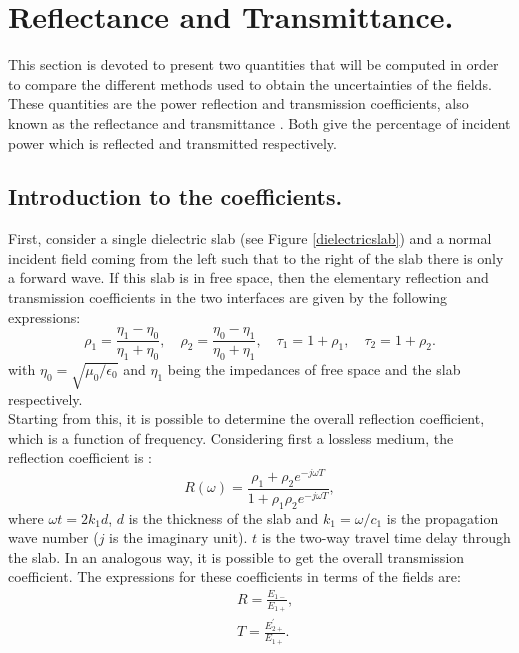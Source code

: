 \documentclass[12pt, oneside]{book}
\begin{document}
\chapter{Reflectance and Transmittance.}
This section is devoted to present two quantities that will be computed in order to compare the different methods used to obtain the uncertainties of the fields. These quantities are the power reflection and transmission coefficients, also known as the reflectance and transmittance \cite{orfanidis2002electromagnetic}. Both give the percentage of incident power which is reflected and transmitted respectively. 

\section{Introduction to the coefficients.}
\indent First, consider a single dielectric slab (see Figure \ref{dielectricslab}) and a normal incident field coming from the left such that to the right of the slab there is only a forward wave. If this slab is in free space, then the elementary reflection and transmission coefficients in the two interfaces are given by the following expressions: 
\begin{equation}
\rho_{1}=\frac{\eta_{1}-\eta_{0}}{\eta_{1}+\eta_{0}}, \quad \rho_{2}=\frac{\eta_{0}-\eta_{1}}{\eta_{0}+\eta_{1}}, \quad \tau_{1}=1+\rho_{1}, \quad \tau_{2}=1+\rho_{2}.
\end{equation}
with $\eta_0=\sqrt{\mu_0/\epsilon_0}$ and $\eta_1$ being the impedances of free space and the slab respectively. \\
\indent Starting from this, it is possible to determine the overall reflection coefficient, which is a function of frequency. Considering first a lossless medium, the reflection coefficient is  \cite{orfanidis2002electromagnetic}:
\begin{equation}
R(\omega)=\frac{\rho_{1}+\rho_{2} e^{-j \omega T}}{1+\rho_{1} \rho_{2} e^{-j \omega T}},
\end{equation}
where $\omega t= 2k_1 d$, $d$ is the thickness of the slab and $k_1=\omega/c_1$ is the propagation wave number ($j$ is the imaginary unit). $t$ is the two-way travel time delay through the slab. In an analogous way, it is possible to get the overall transmission coefficient. The expressions for these coefficients in terms of the fields are:
\begin{equation}
\begin{aligned}
& R=\frac{E_{1-}}{E_{1+}}, \\
&T=\frac{E_{2+}^{\prime}}{E_{1+}}.
\end{aligned}
\end{equation}
\end{document}
